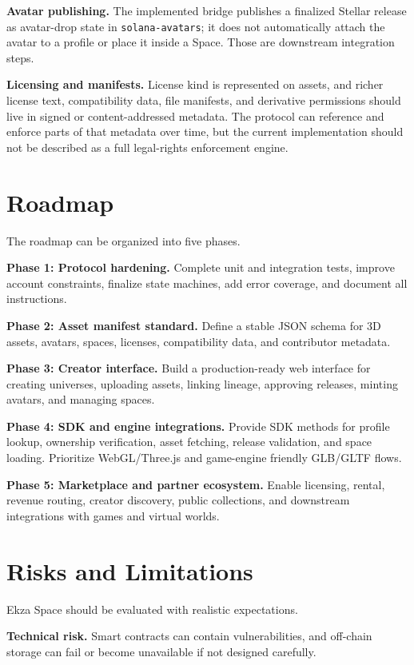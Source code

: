 \documentclass[10pt,twocolumn]{article}
\newcommand{\protocol}[1]{\texttt{#1}}
\begin{document}
\textbf{Avatar publishing.} The implemented bridge publishes a finalized Stellar release as avatar-drop state in \protocol{solana-avatars}; it does not automatically attach the avatar to a profile or place it inside a Space. Those are downstream integration steps.

\textbf{Licensing and manifests.} License kind is represented on assets, and richer license text, compatibility data, file manifests, and derivative permissions should live in signed or content-addressed metadata. The protocol can reference and enforce parts of that metadata over time, but the current implementation should not be described as a full legal-rights enforcement engine.

\section{Roadmap}
The roadmap can be organized into five phases.

\textbf{Phase 1: Protocol hardening.} Complete unit and integration tests, improve account constraints, finalize state machines, add error coverage, and document all instructions.

\textbf{Phase 2: Asset manifest standard.} Define a stable JSON schema for 3D assets, avatars, spaces, licenses, compatibility data, and contributor metadata.

\textbf{Phase 3: Creator interface.} Build a production-ready web interface for creating universes, uploading assets, linking lineage, approving releases, minting avatars, and managing spaces.

\textbf{Phase 4: SDK and engine integrations.} Provide SDK methods for profile lookup, ownership verification, asset fetching, release validation, and space loading. Prioritize WebGL/Three.js and game-engine friendly GLB/GLTF flows.

\textbf{Phase 5: Marketplace and partner ecosystem.} Enable licensing, rental, revenue routing, creator discovery, public collections, and downstream integrations with games and virtual worlds.

\section{Risks and Limitations}
Ekza Space should be evaluated with realistic expectations.

\textbf{Technical risk.} Smart contracts can contain vulnerabilities, and off-chain storage can fail or become unavailable if not designed carefully.
\end{document}
